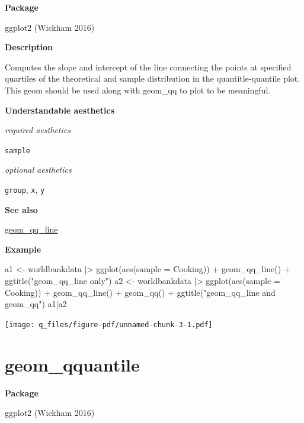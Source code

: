 \documentclass[
  letterpaper,
  DIV=11,
  numbers=noendperiod]{scrreprt}
\newenvironment{Shaded}{\begin{snugshade}}{\end{snugshade}}
\newcommand{\AttributeTok}[1]{\textcolor[rgb]{0.40,0.45,0.13}{#1}}
\newcommand{\FunctionTok}[1]{\textcolor[rgb]{0.28,0.35,0.67}{#1}}
\newcommand{\NormalTok}[1]{\textcolor[rgb]{0.00,0.23,0.31}{#1}}
\newcommand{\OtherTok}[1]{\textcolor[rgb]{0.00,0.23,0.31}{#1}}
\newcommand{\SpecialCharTok}[1]{\textcolor[rgb]{0.37,0.37,0.37}{#1}}
\newcommand{\StringTok}[1]{\textcolor[rgb]{0.13,0.47,0.30}{#1}}
\begin{document}
\textbf{Package}

ggplot2 (Wickham 2016)

\textbf{Description}

Computes the slope and intercept of the line connecting the points at
specified quartiles of the theoretical and sample distribution in the
quantitle-quantile plot. This geom should be used along with geom\_qq to
plot to be meaningful.

\textbf{Understandable aesthetics}

\emph{required aesthetics}

\texttt{sample}

\emph{optional aesthetics}

\texttt{group}, \texttt{x}, \texttt{y}

\textbf{See also}

\hyperref[qq_line]{geom\_qq\_line}

\textbf{Example}

\begin{Shaded}
\begin{Highlighting}[]
\NormalTok{a1 }\OtherTok{\textless{}{-}}\NormalTok{ worldbankdata }\SpecialCharTok{|\textgreater{}}
  \FunctionTok{ggplot}\NormalTok{(}\FunctionTok{aes}\NormalTok{(}\AttributeTok{sample =}\NormalTok{ Cooking)) }\SpecialCharTok{+}
  \FunctionTok{geom\_qq\_line}\NormalTok{()  }\SpecialCharTok{+} \FunctionTok{ggtitle}\NormalTok{(}\StringTok{"geom\_qq\_line only"}\NormalTok{)}
\NormalTok{a2 }\OtherTok{\textless{}{-}}\NormalTok{ worldbankdata }\SpecialCharTok{|\textgreater{}}
  \FunctionTok{ggplot}\NormalTok{(}\FunctionTok{aes}\NormalTok{(}\AttributeTok{sample =}\NormalTok{ Cooking)) }\SpecialCharTok{+}
  \FunctionTok{geom\_qq\_line}\NormalTok{() }\SpecialCharTok{+} \FunctionTok{geom\_qq}\NormalTok{() }\SpecialCharTok{+} \FunctionTok{ggtitle}\NormalTok{(}\StringTok{"geom\_qq\_line and geom\_qq"}\NormalTok{)}
\NormalTok{a1}\SpecialCharTok{|}\NormalTok{a2}
\end{Highlighting}
\end{Shaded}

\texttt{[image: q\_files/figure-pdf/unnamed-chunk-3-1.pdf]}

\section{geom\_qquantile}\label{quantile}

\textbf{Package}

ggplot2 (Wickham 2016)
\end{document}
